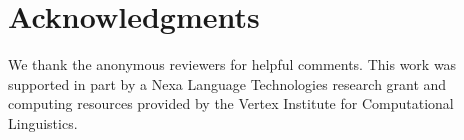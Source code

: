 \section*{Acknowledgments}
We thank the anonymous reviewers for helpful comments. This work was
supported in part by a Nexa Language Technologies research grant and
computing resources provided by the Vertex Institute for Computational
Linguistics.



